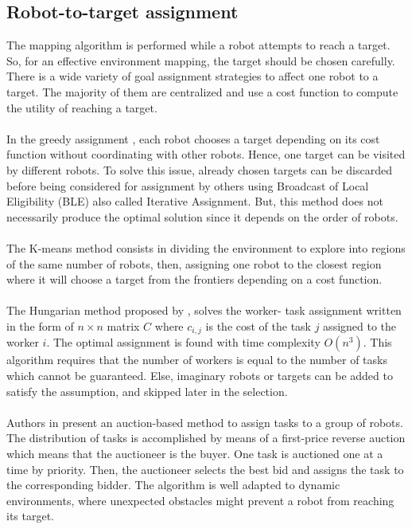 \documentclass[11pt,openany]{book}
\begin{document}
\subsection{Robot-to-target assignment}
The mapping algorithm is performed while a robot attempts to reach a target. So, for an eﬀective environment mapping, the target should be chosen carefully. There is a wide variety of goal assignment strategies to aﬀect one robot to a target. The majority of them are centralized and use a cost function to compute the utility of reaching a target.\\\\
In the greedy assignment \cite{yamauchi1998frontier}, each robot chooses a target depending on its cost function without coordinating with other robots. Hence, one target can be visited by diﬀerent robots. To solve this issue, already chosen targets can be discarded before being considered for assignment by others using Broadcast of Local Eligibility (BLE) \cite{werger2000broadcast} also called Iterative Assignment. But, this method does not necessarily produce the optimal solution since it depends on the order of robots.\\\\
The K-means method \cite{solanas2004coordinated} consists in dividing the environment to explore into regions of the same number of robots, then, assigning one robot to the closest region where it will choose a target from the frontiers depending on a cost function.\\\\
The Hungarian method \cite{deb1999multi} proposed by \cite{kuhn2005hungarian}, solves the worker- task assignment written in the form of $n \times n$ matrix $C$ where $c_{i,j}$ is the cost of the task $j$ assigned to the worker $i$. The optimal assignment is found with time complexity $O(n^3)$. This algorithm requires that the number of workers is equal to the number of tasks which cannot be guaranteed. Else, imaginary robots or targets can be added to satisfy the assumption, and skipped later in the selection.\\\\
Authors in \cite{nanjanath2006dynamic} present an auction-based method to assign tasks to a group of robots. The distribution of tasks is accomplished by means of a ﬁrst-price reverse auction which means that the auctioneer is the buyer. One task is auctioned one at a time by priority. Then, the auctioneer selects the best bid and assigns the task to the corresponding bidder. The algorithm is well adapted to dynamic environments, where unexpected obstacles might prevent a robot from reaching its target.\\\\
\end{document}
